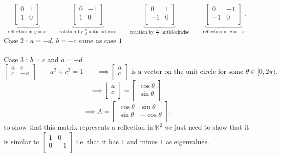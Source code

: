 \documentclass{report}
\begin{document}
 \[
 \underbrace{ \begin{bmatrix}
 0 & 1\\
 1 & 0\\
\end{bmatrix} }_{ \text{reflection in } y = x} \qquad \underbrace{ \begin{bmatrix}
0 & -1\\
 1&0 \\
\end{bmatrix} }_{ \text{rotation by } \frac{\pi}{2} \text{ anticlockwise} } \qquad  \underbrace{ \begin{bmatrix}
0 & 1\\
-1 & 0\\
\end{bmatrix} }_{ \text{rotation by } \frac{3\pi}{2} \text{ anticlockwise}} \qquad \underbrace{ \begin{bmatrix}
0 & -1\\
-1 & 0\\
\end{bmatrix} }_{ \text{reflection in } y = -x} 
 .\] 
 Case $ 2$ : $ a = -d$, $ b = -c$
 same as case $ 1$ \\
 \\
 Case $ 3$ : $ b=c$ and $ a = -d$\\
 \[
 \begin{bmatrix}
 a & c\\
 c & -a\\
 \end{bmatrix} \qquad  a^2 + c^2 = 1 \qquad  \implies \begin{bmatrix}
 a\\
 c\\
 \end{bmatrix}
  \text{ is a vector on the unit circle for some } \theta \in [0, 2\pi)
 .\] 
 \[
 \implies \begin{bmatrix}
 a\\
 c\\
 \end{bmatrix}
 = \begin{bmatrix}
 \cos \theta \\
 \sin \theta \\
 \end{bmatrix}
 .\]
 \[
 \implies A = \begin{bmatrix}
 \cos \theta  & \sin \theta \\
 \sin \theta  & - \cos \theta \\
 \end{bmatrix}
 .\] 
 to show that this matrix represents a reflection in $ \mathbb{R} ^2$ we just need to show that it is similar to $ \begin{bmatrix}
 1 & 0\\
 0 & -1\\
 \end{bmatrix}$ i.e. that it has $ 1$ and minus $ 1$ as eigenvalues. \\
\end{document}
